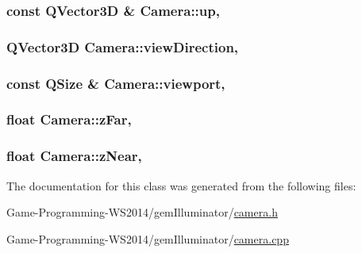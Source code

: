 \subsubsection[{up}]{\setlength{\rightskip}{0pt plus 5cm}const Q\+Vector3\+D \& Camera\+::up\hspace{0.3cm}{\ttfamily [read]}, {\ttfamily [write]}}\label{class_camera_a86995a93a125a9d9941f10144c4c398e}
\hypertarget{class_camera_a7745654f918533ddc5e285bcf630e934}{}
\subsubsection[{view\+Direction}]{\setlength{\rightskip}{0pt plus 5cm}Q\+Vector3\+D Camera\+::view\+Direction\hspace{0.3cm}{\ttfamily [read]}, {\ttfamily [write]}}\label{class_camera_a7745654f918533ddc5e285bcf630e934}
\hypertarget{class_camera_a56b601feb6a54eee0bce1910cdeac291}{}
\subsubsection[{viewport}]{\setlength{\rightskip}{0pt plus 5cm}const Q\+Size \& Camera\+::viewport\hspace{0.3cm}{\ttfamily [read]}, {\ttfamily [write]}}\label{class_camera_a56b601feb6a54eee0bce1910cdeac291}
\hypertarget{class_camera_a6290469f972a5903c805725db563f41f}{}
\subsubsection[{z\+Far}]{\setlength{\rightskip}{0pt plus 5cm}float Camera\+::z\+Far\hspace{0.3cm}{\ttfamily [read]}, {\ttfamily [write]}}\label{class_camera_a6290469f972a5903c805725db563f41f}
\hypertarget{class_camera_a1db2166635ff27594eda3a23130b66ac}{}
\subsubsection[{z\+Near}]{\setlength{\rightskip}{0pt plus 5cm}float Camera\+::z\+Near\hspace{0.3cm}{\ttfamily [read]}, {\ttfamily [write]}}\label{class_camera_a1db2166635ff27594eda3a23130b66ac}


The documentation for this class was generated from the following files\+:\begin{DoxyCompactItemize}
\item 
Game-\/\+Programming-\/\+W\+S2014/gem\+Illuminator/\hyperlink{camera_8h}{camera.\+h}\item 
Game-\/\+Programming-\/\+W\+S2014/gem\+Illuminator/\hyperlink{camera_8cpp}{camera.\+cpp}\end{DoxyCompactItemize}
